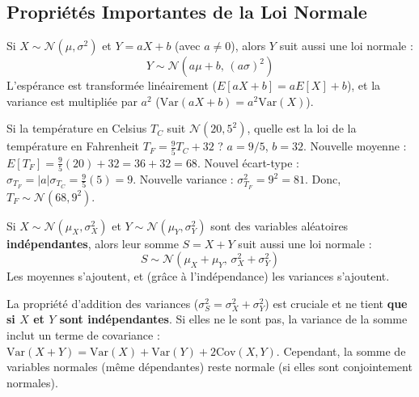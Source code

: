 \subsection{Propriétés Importantes de la Loi Normale}

\begin{theorembox}
Si $X \sim \mathcal{N}(\mu, \sigma^2)$ et $Y = aX + b$ (avec $a \neq 0$), alors $Y$ suit aussi une loi normale :
$$ Y \sim \mathcal{N}(a\mu + b, \, (a\sigma)^2) $$
L'espérance est transformée linéairement ($E[aX+b] = aE[X]+b$), et la variance est multipliée par $a^2$ ($\text{Var}(aX+b) = a^2\text{Var}(X)$).
\end{theorembox}

\begin{examplebox}
Si la température en Celsius $T_C$ suit $\mathcal{N}(20, 5^2)$, quelle est la loi de la température en Fahrenheit $T_F = \frac{9}{5}T_C + 32$ ?
\newline
$a = 9/5$, $b=32$.
\newline
Nouvelle moyenne : $E[T_F] = \frac{9}{5}(20) + 32 = 36 + 32 = 68$.
\newline
Nouvel écart-type : $\sigma_{T_F} = |a|\sigma_{T_C} = \frac{9}{5}(5) = 9$. Nouvelle variance : $\sigma_{T_F}^2 = 9^2 = 81$.
\newline
Donc, $T_F \sim \mathcal{N}(68, 9^2)$.
\end{examplebox}

\begin{theorembox}
Si $X \sim \mathcal{N}(\mu_X, \sigma_X^2)$ et $Y \sim \mathcal{N}(\mu_Y, \sigma_Y^2)$ sont des variables aléatoires \textbf{indépendantes}, alors leur somme $S = X + Y$ suit aussi une loi normale :
$$ S \sim \mathcal{N}(\mu_X + \mu_Y, \, \sigma_X^2 + \sigma_Y^2) $$
Les moyennes s'ajoutent, et (grâce à l'indépendance) les variances s'ajoutent.
\end{theorembox}

\begin{remarquebox}
La propriété d'addition des variances ($\sigma_S^2 = \sigma_X^2 + \sigma_Y^2$) est cruciale et ne tient \textbf{que si $X$ et $Y$ sont indépendantes}. Si elles ne le sont pas, la variance de la somme inclut un terme de covariance : $\text{Var}(X+Y) = \text{Var}(X) + \text{Var}(Y) + 2\text{Cov}(X, Y)$. Cependant, la somme de variables normales (même dépendantes) reste normale (si elles sont conjointement normales).
\end{remarquebox}

